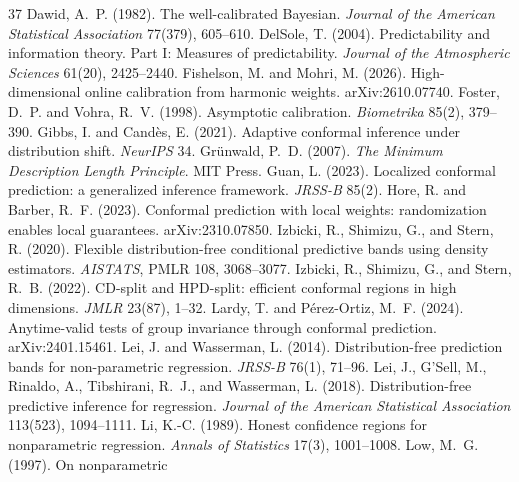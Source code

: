 \documentclass[11pt]{article}
\theoremstyle{remark}
\begin{document}
\begin{thebibliography}{37}
 Dawid, A.~P. (1982). The well-calibrated Bayesian.
  \emph{Journal of the American Statistical Association} 77(379), 605--610.
 DelSole, T. (2004). Predictability and
  information theory. Part I: Measures of predictability. \emph{Journal of the
  Atmospheric Sciences} 61(20), 2425--2440.
 Fishelson, M. and Mohri, M. (2026).
  High-dimensional online calibration from harmonic weights. arXiv:2610.07740.
 Foster, D.~P. and Vohra, R.~V. (1998).
  Asymptotic calibration. \emph{Biometrika} 85(2), 379--390.
 Gibbs, I. and Cand\`es,
  E. (2021). Adaptive conformal inference under distribution shift.
  \emph{NeurIPS} 34.
 Gr\"unwald, P.~D. (2007). \emph{The
  Minimum Description Length Principle}. MIT Press.
 Guan, L. (2023). Localized conformal
  prediction: a generalized inference framework. \emph{JRSS-B} 85(2).
 Hore, R. and Barber, R.~F.
  (2023). Conformal prediction with local weights: randomization enables local
  guarantees. arXiv:2310.07850.
 Izbicki, R., Shimizu, G., and Stern,
  R. (2020). Flexible distribution-free conditional predictive bands using density
  estimators. \emph{AISTATS}, PMLR 108, 3068--3077.
 Izbicki, R., Shimizu, G., and Stern,
  R.~B. (2022). CD-split and HPD-split: efficient conformal regions in high
  dimensions. \emph{JMLR} 23(87), 1--32.
 Lardy, T. and
  P\'erez-Ortiz, M.~F. (2024). Anytime-valid tests of group invariance through
  conformal prediction. arXiv:2401.15461.
 Lei, J. and Wasserman,
  L. (2014). Distribution-free prediction bands for non-parametric regression.
  \emph{JRSS-B} 76(1), 71--96.
 Lei, J., G'Sell, M., Rinaldo, A.,
  Tibshirani, R.~J., and Wasserman, L. (2018). Distribution-free predictive inference
  for regression. \emph{Journal of the American Statistical Association} 113(523),
  1094--1111.
 Li, K.-C. (1989). Honest confidence regions
  for nonparametric regression. \emph{Annals of Statistics} 17(3), 1001--1008.
 Low, M.~G. (1997). On nonparametric

\end{thebibliography}
\end{document}
